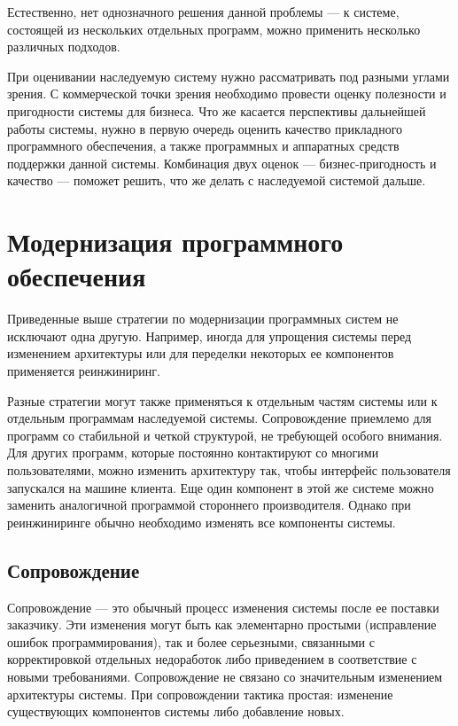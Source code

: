 \documentclass{../../text-style}
\begin{document}
Естественно, нет однозначного решения данной проблемы --- к системе, состоящей из нескольких отдельных программ, можно применить несколько различных подходов.

При оценивании наследуемую систему нужно рассматривать под разными углами зрения. С коммерческой точки зрения необходимо провести оценку полезности и пригодности системы для бизнеса. Что же касается перспективы дальнейшей работы системы, нужно в первую очередь оценить качество прикладного программного обеспечения, а также программных и аппаратных средств поддержки данной системы. Комбинация двух оценок --- бизнес-пригодность и качество --- поможет решить, что же делать с наследуемой системой дальше.

\section{Модернизация программного обеспечения}

Приведенные выше стратегии по модернизации программных систем не исключают одна другую. Например, иногда для упрощения системы перед изменением архитектуры или для переделки некоторых ее компонентов применяется реинжиниринг.

Разные стратегии могут также применяться к отдельным частям системы или к отдельным программам наследуемой системы. Сопровождение приемлемо для программ со стабильной и четкой структурой, не требующей особого внимания. Для других программ, которые постоянно контактируют со многими пользователями, можно изменить архитектуру так, чтобы интерфейс пользователя запускался на машине клиента. Еще один компонент в этой же системе можно заменить аналогичной программой стороннего производителя. Однако при реинжиниринге обычно необходимо изменять все компоненты системы.

\subsection{Сопровождение}

Сопровождение --- это обычный процесс изменения системы после ее поставки заказчику. Эти изменения могут быть как элементарно простыми (исправление ошибок программирования), так и более серьезными, связанными с корректировкой отдельных недоработок либо приведением в соответствие с новыми требованиями. Сопровождение не связано со значительным изменением архитектуры системы. При сопровождении тактика простая: изменение существующих компонентов системы либо добавление новых.
\end{document}
